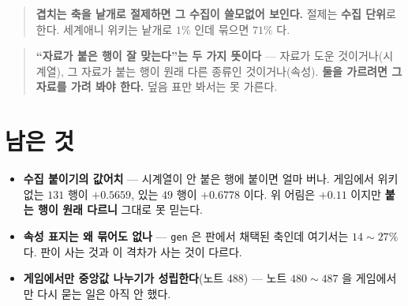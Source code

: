 \documentclass[11pt]{article}
\begin{document}
\begin{quote}
\textbf{겹치는 축을 낱개로 절제하면 그 수집이 쓸모없어 보인다.} 절제는
\textbf{수집 단위}로 한다. 세계애니 위키는 낱개로 $1\%$ 인데 묶으면
$71\%$ 다.
\end{quote}

\begin{quote}
\textbf{``자료가 붙은 행이 잘 맞는다''는 두 가지 뜻이다} --- 자료가 도운
것이거나(시계열), 그 자료가 붙는 행이 원래 다른 종류인 것이거나(속성).
\textbf{둘을 가르려면 그 자료를 가려 봐야 한다.} 덮음 표만 봐서는 못
가른다.
\end{quote}

\section*{남은 것}

\begin{itemize}
\item \textbf{수집 붙이기의 값어치} --- 시계열이 안 붙은 행에 붙이면
얼마 버나. 게임에서 위키 없는 $131$ 행이 $+0.5659$, 있는 $49$ 행이
$+0.6778$ 이다. 위 어림은 $+0.11$ 이지만 \textbf{붙는 행이 원래 다르니}
그대로 못 믿는다.
\item \textbf{속성 표지는 왜 묶어도 없나} --- \texttt{gen} 은 판에서
채택된 축인데 여기서는 $14 \sim 27\%$ 다. 판이 사는 것과 이 격차가
사는 것이 다르다.
\item \textbf{게임에서만 중앙값 나누기가 성립한다}(노트 488) --- 노트
$480 \sim 487$ 을 게임에서만 다시 묻는 일은 아직 안 했다.
\end{itemize}
\end{document}
